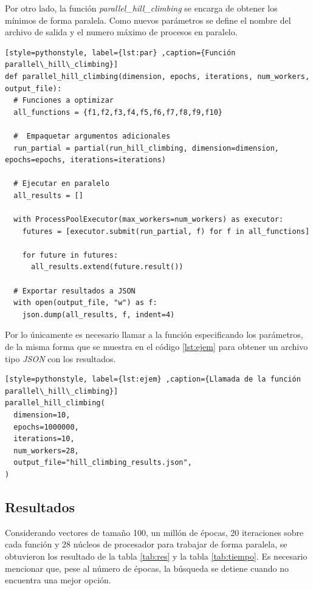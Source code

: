 \documentclass[12pt,twoside]{article}
\begin{document}
Por otro lado, la función \textit{parallel\_hill\_climbing} se encarga de obtener los mínimos de forma paralela. Como nuevos parámetros se define el nombre del archivo de salida y el numero máximo de procesos en paralelo.

\begin{lstlisting}[style=pythonstyle, label={lst:par} ,caption={Función parallel\_hill\_climbing}]
def parallel_hill_climbing(dimension, epochs, iterations, num_workers, output_file):
  # Funciones a optimizar
  all_functions = {f1,f2,f3,f4,f5,f6,f7,f8,f9,f10}

  #  Empaquetar argumentos adicionales
  run_partial = partial(run_hill_climbing, dimension=dimension, epochs=epochs, iterations=iterations)

  # Ejecutar en paralelo
  all_results = []

  with ProcessPoolExecutor(max_workers=num_workers) as executor:
    futures = [executor.submit(run_partial, f) for f in all_functions]

    for future in futures:
      all_results.extend(future.result())

  # Exportar resultados a JSON
  with open(output_file, "w") as f:
    json.dump(all_results, f, indent=4)
\end{lstlisting}

Por lo únicamente es necesario llamar a la función especificando los parámetros, de la misma forma que se muestra en el código \ref{lst:ejem} para obtener un archivo tipo \textit{JSON} con los resultados.

\begin{lstlisting}[style=pythonstyle, label={lst:ejem} ,caption={Llamada de la función parallel\_hill\_climbing}]
parallel_hill_climbing(
  dimension=10,                        
  epochs=1000000,             
  iterations=10,                     
  num_workers=28,          
  output_file="hill_climbing_results.json", 
)
\end{lstlisting}

\subsection{Resultados}

Considerando vectores de tamaño 100, un millón de épocas, 20 iteraciones sobre cada función y 28 núcleos de procesador para trabajar de forma paralela, se obtuvieron los resultado de la tabla \ref{tab:res} y la tabla \ref{tab:tiempo}. Es necesario mencionar que, pese al número de épocas, la búsqueda se detiene cuando no encuentra una mejor opción.
\end{document}
